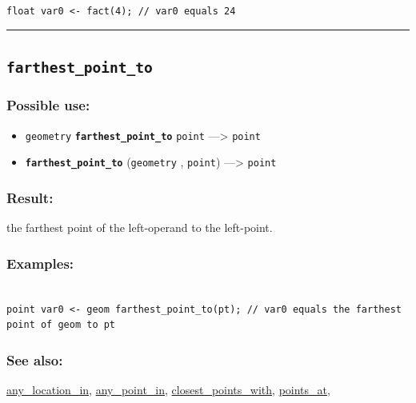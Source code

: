 \documentclass[]{book}
\providecommand{\tightlist}{%
  \setlength{\itemsep}{0pt}\setlength{\parskip}{0pt}}
\theoremstyle{definition}
\theoremstyle{definition}
\theoremstyle{definition}
\theoremstyle{remark}
\begin{document}
\begin{verbatim}
 
float var0 <- fact(4); // var0 equals 24
\end{verbatim}

\begin{center}\rule{0.5\linewidth}{\linethickness}\end{center}

\subsection{\texorpdfstring{\texttt{farthest\_point\_to}}{farthest\_point\_to}}\label{farthest_point_to}

\subsubsection{Possible use:}\label{possible-use-162}

\begin{itemize}
\tightlist
\item
  \texttt{geometry} \textbf{\texttt{farthest\_point\_to}} \texttt{point}
  ---\textgreater{} \texttt{point}
\item
  \textbf{\texttt{farthest\_point\_to}} (\texttt{geometry} ,
  \texttt{point}) ---\textgreater{} \texttt{point}
\end{itemize}

\subsubsection{Result:}\label{result-156}

the farthest point of the left-operand to the left-point.

\subsubsection{Examples:}\label{examples-121}

\begin{verbatim}
 
point var0 <- geom farthest_point_to(pt); // var0 equals the farthest point of geom to pt
\end{verbatim}

\subsubsection{See also:}\label{see-also-91}

\href{operators-a-to-a.html\#any_location_in}{any\_location\_in},
\href{operators-a-to-a.html\#any_point_in}{any\_point\_in},
\href{operators-b-to-c.html\#closest_points_with}{closest\_points\_with},
\href{operators-n-to-r.html\#points_at}{points\_at},
\end{document}
